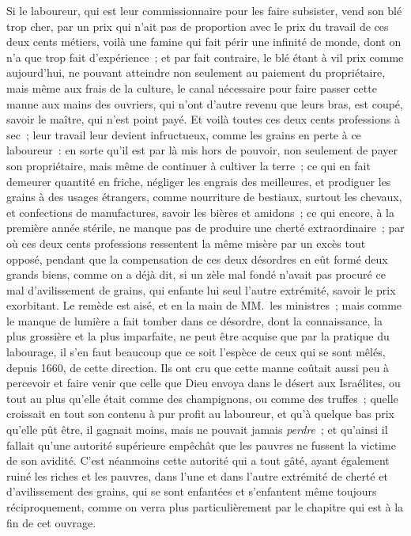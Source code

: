 \documentclass[french,twoside]{book} %
\begin{document}
Si le laboureur, qui est leur commissionnaire pour les faire subsister, vend son blé trop cher, par un prix qui n’ait pas de proportion avec le prix du travail de ces deux cents métiers, voilà une famine qui fait périr une infinité de monde, dont on n’a que trop fait d’expérience ; et par fait contraire, le blé étant à vil prix comme aujourd’hui, ne pouvant atteindre non seulement au paiement du propriétaire, mais même aux frais de la culture, le canal nécessaire pour faire passer cette manne aux mains des ouvriers, qui n’ont d’autre revenu que leurs bras, est coupé, savoir le maître, qui n’est point payé. Et voilà toutes ces deux cents professions à sec ; leur travail leur devient infructueux, comme les grains en perte à ce laboureur : en sorte qu’il est par là mis hors de pouvoir, non seulement de payer son propriétaire, mais même de continuer à cultiver la terre ; ce qui en fait demeurer quantité en friche, négliger les engrais des meilleures, et prodiguer les grains à des usages étrangers, comme nourriture de bestiaux, surtout les chevaux, et confections de manufactures, savoir les bières et amidons ; ce qui encore, à la première année stérile, ne manque pas de produire une cherté extraordinaire ; par où ces deux cents professions ressentent la même misère par un excès tout opposé, pendant que la compensation de ces deux désordres en eût formé deux grands biens, comme on a déjà dit, si un zèle mal fondé n’avait pas procuré ce mal d’avilissement de grains, qui enfante lui seul l’autre extrémité, savoir le prix exorbitant. Le remède est aisé, et en la main de MM. les ministres ; mais comme le manque de lumière a fait tomber dans ce désordre, dont la connaissance, la plus grossière et la plus imparfaite, ne peut être acquise que par la pratique du labourage, il s’en faut beaucoup que ce soit l’espèce de ceux qui se sont mêlés, depuis 1660, de cette direction. Ils ont cru que cette manne coûtait aussi peu à percevoir et faire venir que celle que Dieu envoya dans le désert aux Israélites, ou tout au plus qu’elle était comme des champignons, ou comme des truffes ; quelle croissait en tout son contenu à pur profit au laboureur, et qu’à quelque bas prix qu’elle pût être, il gagnait moins, mais ne pouvait jamais {\itshape perdre} ; et qu’ainsi il fallait qu’une autorité supérieure empêchât que les pauvres ne fussent la victime de son avidité. C’est néanmoins cette autorité qui a tout gâté, ayant également ruiné les riches et les pauvres, dans l’une et dans l’autre extrémité de cherté et d’avilissement des grains, qui se sont enfantées et s’enfantent même toujours réciproquement, comme on verra plus particulièrement par le chapitre qui est à la fin de cet ouvrage.\par
\end{document}
